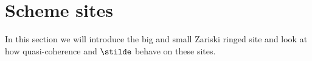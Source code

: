 \section{Scheme sites}  %

In this section we will introduce the big and small Zariski ringed site
and look at how quasi-coherence and $\stilde$ behave on these sites.








%
%
%
%
%
%

